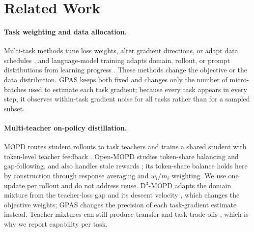 \section{Related Work}

\paragraph{Task weighting and data allocation.}
Multi-task methods tune loss weights, alter gradient directions, or adapt data
schedules
\citep{sener2019multitasklearningmultiobjectiveoptimization,
yu2020gradientsurgerymultitasklearning,
liu2024conflictaversegradientdescentmultitask,chen2018gradnorm}, and
language-model training adapts domain, rollout, or prompt distributions from
learning progress
\citep{albalak2023efficient,wang2025dump,zheng2025greso,gao2025promptcurriculum}.
These methods change the objective or the data distribution. GPAS keeps both
fixed and changes only the number of micro-batches used to estimate each task
gradient; because every task appears in every step, it observes within-task
gradient noise for all tasks rather than for a sampled subset.

\paragraph{Multi-teacher on-policy distillation.}
MOPD routes student rollouts to task teachers and trains a shared student with
token-level teacher feedback \citep{ma2026mopdmultiteacheronpolicydistillation}.
Open-MOPD studies token-share balancing and gap-following, and also handles
stale rewards \citep{gao2026openmopddiagnosingfixingcapability}; its token-share
balance holds here by construction through response averaging and
$w_i/m_i$ weighting. We use one update per rollout and do not address reuse.
D$^3$-MOPD adapts the domain mixture from the teacher-loss gap and its descent
velocity \citep{sun2026d3mopd}, which changes the objective weights; GPAS
changes the precision of each task-gradient estimate instead. Teacher mixtures
can still produce transfer and task trade-offs
\citep{li2026coinsidesdualnature}, which is why we report capability per task.

